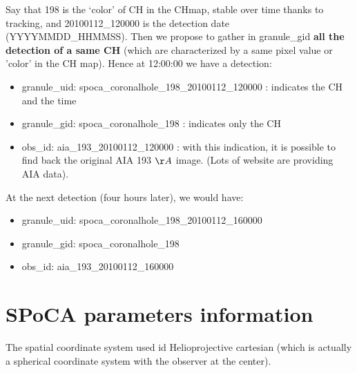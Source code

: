 \documentclass{article}
\begin{document}
Say that  198  is the \lq color' of CH in the CHmap,  stable over time thanks to tracking, and
20100112\_120000 is the detection date (YYYYMMDD\_HHMMSS). Then we propose to gather in granule\_gid {\bf{all the detection of a same CH}} (which are characterized by a same pixel value or 'color' in the CH map). Hence at 12:00:00 we have a detection:
\begin{itemize}
\item granule\_uid: spoca\_coronalhole\_198\_20100112\_120000 : indicates the CH and the time
\item granule\_gid: spoca\_coronalhole\_198 : indicates only the CH
\item obs\_id: aia\_193\_20100112\_120000  : with this indication, it is possible to find back the original AIA 193 $\AA$ image. (Lots of website are providing AIA data).
\end{itemize}
At the next detection (four hours later), we would have:
\begin{itemize}
\item granule\_uid: spoca\_coronalhole\_198\_20100112\_160000
\item granule\_gid: spoca\_coronalhole\_198
\item obs\_id: aia\_193\_20100112\_160000
\end{itemize}

\section{SPoCA parameters information}

The spatial coordinate system used id Helioprojective cartesian (which is actually a spherical coordinate system with the observer at the center).
\end{document}
